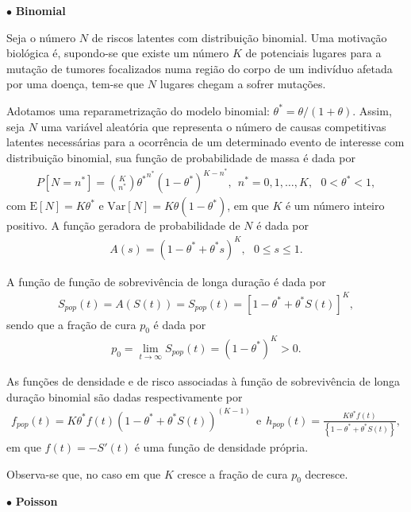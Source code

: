 $\bullet$ \textbf{Binomial}

Seja o número $N$ de riscos latentes com distribuição binomial. Uma motivação biológica é, supondo-se que existe um número $K$ de potenciais lugares para a mutação de tumores focalizados numa região do corpo de um indivíduo afetada por uma doença, tem-se que $N$ lugares chegam a sofrer mutações.

Adotamos uma reparametrização do modelo binomial: ${\theta^{*}} = \theta/(1+\theta)$. Assim, seja $N$ uma variável aleatória que representa o número de causas competitivas latentes necessárias para a ocorrência de um determinado evento de interesse com distribuição binomial, sua função de probabilidade de massa é dada por
\begin{align}\label{distbn}
P[ N = n^{*}] = {K \choose n^{*}}{\theta^{*}}^{n^{*}}(1-{\theta^{*}})^{K-n^{*}},\ \ n^{*} = 0,1,\ldots,K, \ \ \ 0<\theta^{*}<1,
\end{align}
com  $\mbox{E}[N]=K\theta^{*}$ e $\mbox{Var}[N]= K\theta(1-\theta^{*}) $, em que $K$ é um número inteiro positivo. A função geradora de probabilidade de $N$ é dada por
\begin{align}
	A(s) = (1 - \theta^{*} + \theta^{*} s)^K, \ \ \ 0\leq s\leq1.
\end{align}

A função de função de sobrevivência de longa duração é dada por
\begin{align}\label{Spop_Bi}
S_{pop}(t) = A(S(t))	=	S_{pop}(t) = \left[1-\theta^{*}	+ \theta^{*} S(t) \right]^{K} ,
\end{align}
sendo que a fração de cura $p_{0}$ é dada por
\begin{align}\label{p0}
	 p_{0} = \lim_{t\rightarrow \infty}{S_{pop}(t)} = (1-\theta^{*})^{K}>0.
\end{align}

As funções de densidade e de risco associadas à função de sobrevivência de longa duração binomial  são dadas respectivamente por
\begin{align}
f_{pop}(t)	=	K\theta^{*} f(t)(1-\theta^{*}	+ \theta^{*} S(t))^{(K-1)} \  \  \mbox{e} \  \  h_{pop}(t)	=		\frac{K\theta^{*} f(t)}{\left\{1-\theta^{*}	+ \theta^{*} S(t)\right\}},
\end{align}
em que $f(t) = -S'(t)$ é uma função de densidade própria.%

Observa-se que, no caso em que $K$ cresce a fração de cura $p_{0}$ decresce.

$\bullet$ \textbf{Poisson}

